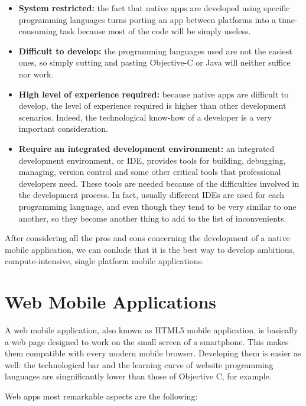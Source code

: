 \begin{itemize}
	\item \textbf{System restricted:} the fact that native apps are developed using specific programming languages turns porting an app between platforms into a time-consuming task because most of the code will be simply useless. 
	\item \textbf{Difficult to develop:} the programming languages used are not the easiest ones, so simply cutting and pasting Objective-C or Java will neither suffice nor work.
	\item \textbf{High level of experience required:} because native apps are difficult to develop, the level of experience required is higher than other development scenarios. Indeed, the technological know-how of a developer is a very important consideration.
	\item \textbf{Require an integrated development environment:} an integrated development environment, or IDE, provides tools for building, debugging, managing, version control and some other critical tools that professional developers need. These tools are needed because of the difficulties involved in the development process. In fact, usually different IDEs are used for each programming language, and even though they tend to be very similar to one another, so they become another thing to add to the list of inconvenients.
\end{itemize}

After considering all the pros and cons concerning the development of a native mobile application, we can conlude that it is the best way to develop ambitious, compute-intensive, single platform mobile applications.

\section{Web Mobile Applications}

A web mobile application, also known as HTML5 mobile application, is basically a web page designed to work on the small screen of a smartphone. This makes them compatible with every modern mobile browser. Developing them is easier as well: the technological bar and the learning curve of website programming languages are singnificantly lower than those of Objective C, for example.

Web apps most remarkable aspects are the following:

